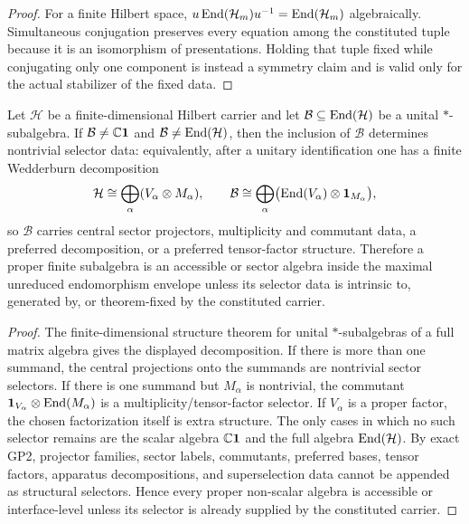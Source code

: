 \documentclass[12pt,a4paper]{article}
\begin{document}
\begin{proof}
For a finite Hilbert space,
\(u\operatorname{End}(\mathcal H_m)u^{-1}=\operatorname{End}(\mathcal H_m)\) algebraically.  Simultaneous
conjugation preserves every equation among the constituted tuple because it
is an isomorphism of presentations.  Holding that tuple fixed while
conjugating only one component is instead a symmetry claim and is valid only
for the actual stabilizer of the fixed data.
\end{proof}


\begin{lemma}
\label{p4:lem:proper-subalgebras-require-selectors}
\leavevmode\par\noindent
Let \(\mathcal H\) be a finite-dimensional Hilbert carrier and let
\(\mathcal B\subseteq\operatorname{End}(\mathcal H)\) be a unital \(*\)-subalgebra.  If
\(\mathcal B\neq\mathbb{C}\mathbf{1}\) and \(\mathcal B\neq\operatorname{End}(\mathcal H)\), then the
inclusion of \(\mathcal B\) determines nontrivial selector data: equivalently,
after a unitary identification one has a finite Wedderburn decomposition
\[
\mathcal H\cong\bigoplus_\alpha (V_\alpha\otimes M_\alpha),
\qquad
\mathcal B\cong\bigoplus_\alpha
\bigl(\operatorname{End}(V_\alpha)\otimes\mathbf{1}_{M_\alpha}\bigr),
\]
so \(\mathcal B\) carries central sector projectors, multiplicity and commutant
data, a preferred decomposition, or a preferred tensor-factor structure.
Therefore a proper finite subalgebra is an accessible or sector algebra inside the
maximal unreduced endomorphism envelope unless its selector data is intrinsic to,
generated by, or theorem-fixed by the constituted carrier.
\end{lemma}

\begin{proof}
The finite-dimensional structure theorem for unital \(*\)-subalgebras of a full
matrix algebra gives the displayed decomposition.  If there is more than one summand,
the central projections onto the summands are nontrivial sector selectors.  If there
is one summand but \(M_\alpha\) is nontrivial, the commutant
\(\mathbf{1}_{V_\alpha}\otimes\operatorname{End}(M_\alpha)\) is a multiplicity/tensor-factor selector.  If
\(V_\alpha\) is a proper factor, the chosen factorization itself is extra structure.
The only cases in which no such selector remains are the scalar algebra
\(\mathbb{C}\mathbf{1}\) and the full algebra \(\operatorname{End}(\mathcal H)\).  By exact GP2, projector families,
sector labels, commutants, preferred bases, tensor factors, apparatus decompositions,
and superselection data cannot be appended as structural selectors.  Hence every
proper non-scalar algebra is accessible or interface-level unless its selector is
already supplied by the constituted carrier.
\end{proof}
\end{document}
